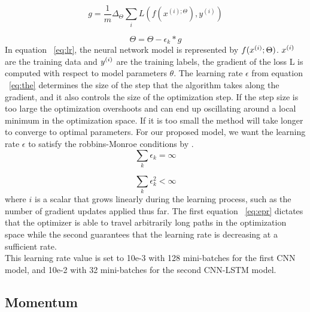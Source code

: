 \begin{equation}\label{eq:lr}
     g=\frac{1}{m}\Delta _{\Theta }\sum _{i}L(f(x^{(i);\Theta }), y^{(i)})
\end{equation}

\begin{equation}\label{eq:the}
    \Theta =\Theta -\epsilon _{k}*g
\end{equation}
In equation ~\ref{eq:lr}, the neural network model is represented by $\large f(x^{(i)};\Theta )$. $\large x^{(i)}$ are the training data and $\large y^{(i)}$  are the training labels, the gradient of the loss L is computed with respect to model parameters $\theta$. The learning rate $\epsilon$ from equation ~\ref{eq:the} determines the size of the step that the algorithm takes along the gradient, and it also controls the size of the optimization step. If the step size is too large the optimization overshoots and can end up oscillating around a local minimum in the optimization space. If it is too small the method will take longer to converge to optimal parameters. For our proposed model, we want the learning rate $\epsilon$ to satisfy the robbins-Monroe conditions by \cite{lecun2015deep}.
\begin{equation}\label{eq:epr}
     \sum _{k}\epsilon _{k}=\infty
\end{equation}

\begin{equation}
    \sum _{k}\epsilon _{k}^{2}< \infty
\end{equation}
where $i$ is a scalar that grows linearly during the learning process, such as
the number of gradient updates applied thus far. The first equation ~\ref{eq:epr} dictates that the optimizer is able to travel arbitrarily long paths in the optimization
space while the second guarantees that the learning rate is decreasing at a
sufficient rate.\\

This learning rate value is set to 10e-3 with 128 mini-batches for the first CNN model, and 10e-2 with 32 mini-batches for the second CNN-LSTM model.

\subsection{Momentum}

